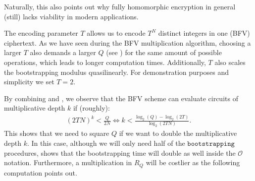 \documentclass[letterpaper,10pt,english]{jupyterBook}
\begin{document}
\sphinxAtStartPar
Naturally, this also points out why fully homomorphic encryption in general (still) lacks viability in modern applications.

\begin{DUlineblock}{0em}
\item[] 
\end{DUlineblock}

\sphinxAtStartPar
The encoding parameter \(T\) allows us to encode \(T^N\) distinct integers in one (BFV) ciphertext.
As we have seen during the BFV multiplication algorithm, choosing a larger \(T\) also demands a larger \(Q\) (see {\hyperref[\detokenize{Thesis:error-after-BFV-multiplication}]{}}) for the same amount of possible operations, which leads to longer computation times.
Additionally, \(T\) also scales the bootstrapping modulus quasi\sphinxhyphen{}linearly.
For demonstration purposes and simplicity we set \(T = 2\).

\label{\detokenize{Thesis:ciphertext-modulus-q}}
\begin{DUlineblock}{0em}
\item[] 
\end{DUlineblock}

\sphinxAtStartPar
By combining {\hyperref[\detokenize{Thesis:correct-BFV-decryption}]{}} and {\hyperref[\detokenize{Thesis:error-after-BFV-multiplication}]{}}, we observe that the BFV scheme can evaluate circuits of multiplicative depth \(k\) if (roughly):
\begin{equation*}
\begin{split}(2TN)^k < \frac{Q}{2N} \iff k < \frac{\log_2(Q)-\log_2(2T)}{\log_2(2TN)}.\end{split}
\end{equation*}
\sphinxAtStartPar
This shows that we need to square \(Q\) if we want to double the multiplicative depth \(k\).
In this case, although we will only need half of the \(\texttt{bootstrapping}\) procedures, {\hyperref[\detokenize{Thesis:complexity-of-scaled-mod}]{}} shows that the bootstrapping time will double as well inside the \(\mathcal O\)\sphinxhyphen{}notation.
Furthermore, a multiplication in \(R_Q\) will be costlier as the following computation points out.
\end{document}
